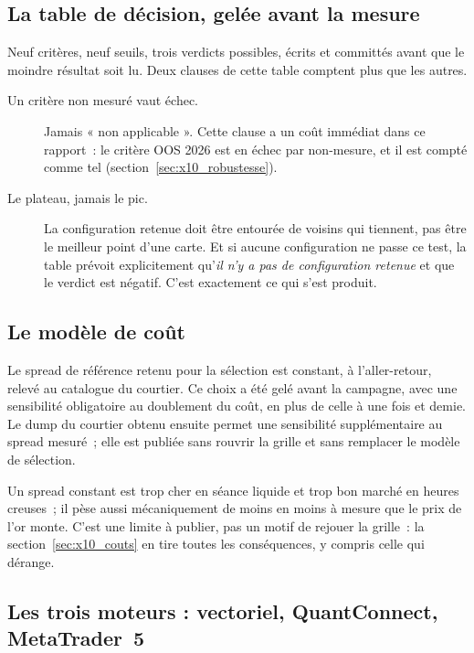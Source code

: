 \subsection{La table de décision, gelée avant la mesure}

Neuf critères, neuf seuils, trois verdicts possibles, écrits et committés
avant que le moindre résultat soit lu. Deux clauses de cette table comptent
plus que les autres.

\begin{description}
  \item[Un critère non mesuré vaut échec.] Jamais « non applicable ». Cette
  clause a un coût immédiat dans ce rapport~: le critère OOS 2026 est en
  échec par non-mesure, et il est compté comme tel
  (section~\ref{sec:x10_robustesse}).
  \item[Le plateau, jamais le pic.] La configuration retenue doit
  être entourée de voisins qui tiennent, pas être le meilleur point d'une
  carte. Et si aucune configuration ne passe ce test, la table prévoit
  explicitement qu'\emph{il n'y a pas de configuration retenue} et que le
  verdict est négatif. C'est exactement ce qui s'est produit.
\end{description}

\subsection{Le modèle de coût}

Le spread de référence retenu pour la sélection est constant, à
\XTenSpreadUsd{} l'aller-retour, relevé au catalogue du courtier. Ce choix a
été gelé avant la campagne, avec une sensibilité obligatoire au doublement
du coût, en plus de celle à une fois et demie. Le dump du courtier obtenu
ensuite permet une sensibilité supplémentaire au spread mesuré~; elle est
publiée sans rouvrir la grille et sans remplacer le modèle de sélection.

Un spread constant est trop cher en séance liquide et trop bon marché en
heures creuses~; il pèse aussi mécaniquement de moins en moins à mesure que le
prix de l'or monte. C'est une limite à publier, pas un motif de rejouer la
grille~: la section~\ref{sec:x10_couts} en tire toutes les conséquences, y
compris celle qui dérange.

\subsection{Les trois moteurs : vectoriel, QuantConnect, MetaTrader~5}

